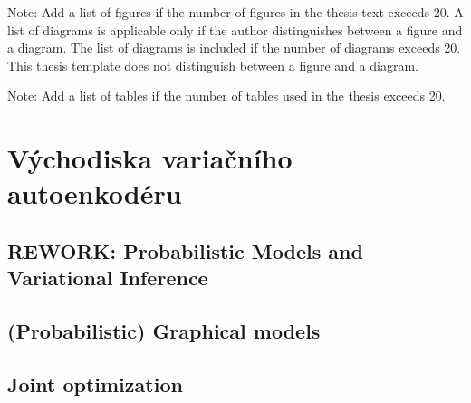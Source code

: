 \documentclass[11pt,a4paper]{report}
\let\openright=\clearpage
\begin{document}


\setcounter{tocdepth}{2}
\tableofcontents

\openright
\listoffigures
Note: Add a list of figures if the number of figures in the thesis text exceeds 20. A list of diagrams is applicable only if the author distinguishes between a figure and a diagram. The list of diagrams is included if the number of diagrams exceeds 20. This thesis template does not distinguish between a figure and a diagram.

\clearpage
\listoftables
Note: Add a list of tables if the number of tables used in the thesis exceeds 20. 



\pagestyle{fancyx}
{%
\pagestyle{plain}

}

\chapter{Východiska variačního autoenkodéru}






\section{REWORK: Probabilistic Models and Variational Inference}
\section{(Probabilistic) Graphical models}
\section{Joint optimization}
\end{document}
